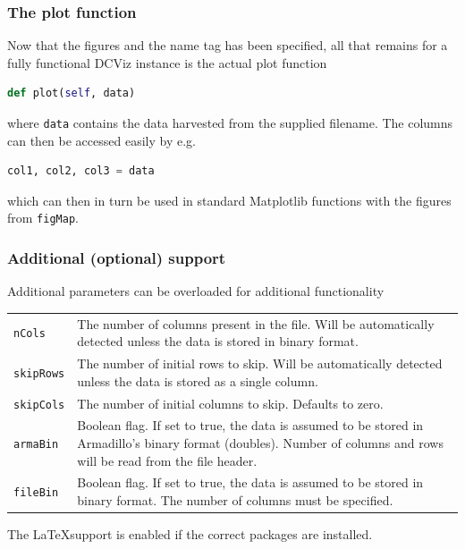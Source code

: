\subsubsection{The plot function}

Now that the figures and the name tag has been specified, all that remains for a fully functional DCViz instance is the actual plot function

\begin{lstlisting}[language=Python, otherkeywords={self}]
def plot(self, data)
\end{lstlisting}

where \verb+data+ contains the data harvested from the supplied filename. The columns can then be accessed easily by e.g.

\begin{lstlisting}[language=Python]
col1, col2, col3 = data
\end{lstlisting}

which can then in turn be used in standard Matplotlib functions with the figures from \verb+figMap+.

\subsubsection{Additional (optional) support}

Additional parameters can be overloaded for additional functionality

\begin{small}
\begin{tabular}{lp{14cm - 7pt}}
\verb+nCols+ & The number of columns present in the file. Will be automatically detected unless the data is stored in binary format.\\
\verb+skipRows+ & The number of initial rows to skip. Will be automatically detected unless the data is stored as a single column.\\
\verb+skipCols+ & The number of initial columns to skip. Defaults to zero.\\
\verb+armaBin+ & Boolean flag. If set to true, the data is assumed to be stored in Armadillo's binary format (doubles). Number of columns and rows will be read from the file header.\\
\verb+fileBin+ & Boolean flag. If set to true, the data is assumed to be stored in binary format. The number of columns must be specified.
\end{tabular}
\end{small}

The \LaTeX support is enabled if the correct packages are installed.

